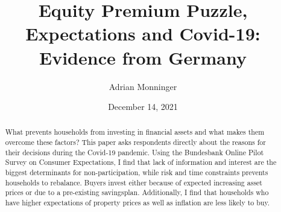\documentclass[ProjectABM]{subfiles}
\begin{document}
\providecommand{\versn}{pdf} %
\ifthenelse{\boolean{Web}}{    %
  \renewcommand{\versn}{Web}     %
  \renewcommand{\rootFromOut}{.} %
}{}  %


\title{Equity Premium Puzzle, Expectations and Covid-19:\\ Evidence from Germany}

\author{Adrian Monninger\authNum}




\renewcommand{\forcedate}{December 14, 2021}\date{\forcedate}

\maketitle
\hypertarget{abstract}{}
\begin{abstract}
What prevents households from investing in financial assets and what makes them overcome these factors? This paper asks respondents directly about the reasons for their decisions during the Covid-19 pandemic. Using the Bundesbank Online Pilot Survey on Consumer Expectations, I find that lack of information and interest are the biggest determinants for non-participation, while risk and time constraints prevents households to rebalance. Buyers invest either because of expected increasing asset prices or due to a pre-existing savingsplan. Additionally, I find that households who have higher expectations of property prices as well as inflation are less likely to buy.
\end{abstract}


\hypertarget{links}{}

\begin{authorsinfo}
\end{authorsinfo}
\end{document}
